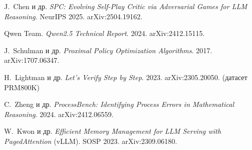 \documentclass[11pt,a4paper]{article}
\begin{document}
{\footnotesize
\begin{enumerate}[label={[\arabic*]},leftmargin=2.2em,topsep=2pt,itemsep=1pt]
  \item J.~Chen и др. \textit{SPC: Evolving Self-Play Critic via Adversarial Games for LLM Reasoning}. NeurIPS 2025. arXiv:2504.19162.
  \item Qwen Team. \textit{Qwen2.5 Technical Report}. 2024. arXiv:2412.15115.
  \item J.~Schulman и др. \textit{Proximal Policy Optimization Algorithms}. 2017. arXiv:1707.06347.
  \item H.~Lightman и др. \textit{Let's Verify Step by Step}. 2023. arXiv:2305.20050. (датасет PRM800K)
  \item C.~Zheng и др. \textit{ProcessBench: Identifying Process Errors in Mathematical Reasoning}. 2024. arXiv:2412.06559.
  \item W.~Kwon и др. \textit{Efficient Memory Management for LLM Serving with PagedAttention} (vLLM). SOSP 2023. arXiv:2309.06180.
\end{enumerate}
}
\end{document}
